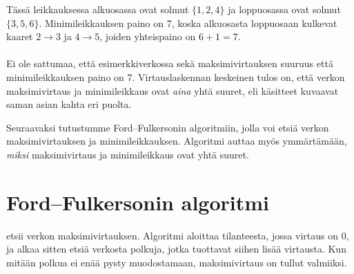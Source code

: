 \begin{center}
\end{center}

Tässä leikkauksessa alkuosassa ovat solmut $\{1,2,4\}$
ja loppuosassa ovat solmut $\{3,5,6\}$.
Minimileikkauksen paino on 7,
koska alkuosasta loppuosaan kulkevat
kaaret $2 \rightarrow 3$ ja $4 \rightarrow 5$,
joiden yhteispaino on $6+1=7$.
\\\\
Ei ole sattumaa, että esimerkkiverkossa
sekä maksimivirtauksen suuruus
että minimileikkauksen paino on 7.
Virtauslaskennan keskeinen tulos on,
että verkon maksimivirtaus ja
minimileikkaus
ovat \textit{aina} yhtä suuret,
eli käsitteet kuvaavat saman asian
kahta eri puolta.

Seuraavaksi tutustumme Ford–Fulkersonin
algoritmiin, jolla voi etsiä verkon
maksimivirtauksen ja
minimileikkauksen.
Algoritmi auttaa myös ymmärtämään,
\textit{miksi} maksimivirtaus ja
minimileikkaus ovat yhtä suuret.

\section{Ford–Fulkersonin algoritmi}


 etsii verkon maksimivirtauksen.
Algoritmi aloittaa tilanteesta,
jossa virtaus on 0, ja alkaa sitten etsiä verkosta polkuja,
jotka tuottavat siihen lisää virtausta.
Kun mitään polkua ei enää pysty muodostamaan,
maksimivirtaus on tullut valmiiksi.

